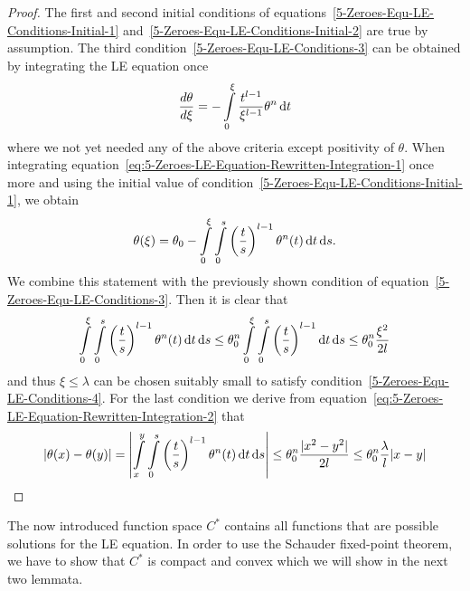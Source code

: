 \begin{proof}
	The first and second initial conditions of equations~\eqref{5-Zeroes-Equ-LE-Conditions-Initial-1} and~\eqref{5-Zeroes-Equ-LE-Conditions-Initial-2} are true by assumption.
	The third condition~\eqref{5-Zeroes-Equ-LE-Conditions-3} can be obtained by integrating the \ac{LE} equation once
	\begin{equation}
		\frac{d\theta}{d\xi} = -\int\limits_0^\xi \frac{t^{l-1}}{\xi^{l-1}}\theta^n \mathop{}\!\mathrm{d} t
		\label{eq:5-Zeroes-LE-Equation-Rewritten-Integration-1}
	\end{equation}
	where we not yet needed any of the above criteria except positivity of $\theta$.
	When integrating equation~\eqref{eq:5-Zeroes-LE-Equation-Rewritten-Integration-1} once more and using the initial value of condition~\eqref{5-Zeroes-Equ-LE-Conditions-Initial-1}, we obtain
	\begin{equation}
		\theta(\xi) = \theta_0 -\int\limits_0^\xi\int\limits_0^s \left(\frac{t}{s}\right)^{l-1}\theta^n(t) \mathop{}\!\mathrm{d} t \mathop{}\!\mathrm{d} s.
		\label{eq:5-Zeroes-LE-Equation-Rewritten-Integration-2}
	\end{equation}
	We combine this statement with the previously shown condition of equation~\eqref{5-Zeroes-Equ-LE-Conditions-3}.
	Then it is clear that
	\begin{equation}
		\int\limits_0^\xi\int\limits_0^s \left(\frac{t}{s}\right)^{l-1}\theta^n(t) \mathop{}\!\mathrm{d} t \mathop{}\!\mathrm{d} s \leq \theta_0^n\int\limits_0^\xi\int\limits_0^s \left(\frac{t}{s}\right)^{l-1} \mathop{}\!\mathrm{d} t \mathop{}\!\mathrm{d} s \leq \theta_0^n\frac{\xi^2}{2l}
		\label{eq:5-Zeroes-LE-Equation-Rewritten-Inequality}
	\end{equation}
	and thus $\xi\leq\lambda$ can be chosen suitably small to satisfy condition~\eqref{5-Zeroes-Equ-LE-Conditions-4}.
	For the last condition we derive from equation~\eqref{eq:5-Zeroes-LE-Equation-Rewritten-Integration-2} that
	\begin{equation}
		|\theta(x)-\theta(y)| = \left|\int\limits_x^y\int\limits_0^s \left(\frac{t}{s}\right)^{l-1}\theta^n(t) \mathop{}\!\mathrm{d} t \mathop{}\!\mathrm{d} s\right| \leq \theta^n_0\frac{|x^2-y^2|}{2l} \leq \theta^n_0\frac{\lambda}{l}|x-y|
		\label{eq:5-Zeroes-LE-Equation-Rewritten-Inequality-2}
	\end{equation}
\end{proof}\noindent
The now introduced function space $C^*$ contains all functions that are possible solutions for the \ac{LE} equation.
In order to use the Schauder fixed-point theorem, we have to show that $C^*$ is compact and convex which we will show in the next two lemmata.
